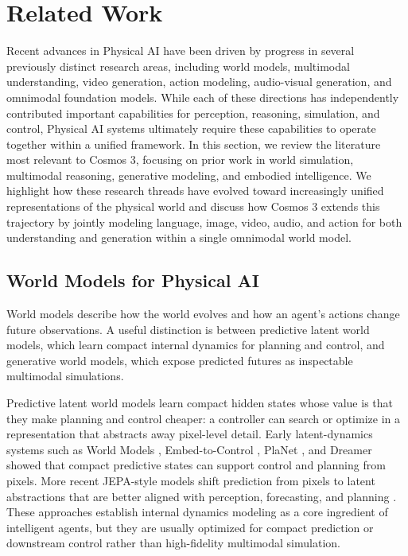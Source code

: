 \section{Related Work}
\label{sec::related_work}

Recent advances in Physical AI have been driven by progress in several previously distinct research areas, including world models, multimodal understanding, video generation, action modeling, audio-visual generation, and omnimodal foundation models. While each of these directions has independently contributed important capabilities for perception, reasoning, simulation, and control, Physical AI systems ultimately require these capabilities to operate together within a unified framework. In this section, we review the literature most relevant to Cosmos 3, focusing on prior work in world simulation, multimodal reasoning, generative modeling, and embodied intelligence. We highlight how these research threads have evolved toward increasingly unified representations of the physical world and discuss how Cosmos 3 extends this trajectory by jointly modeling language, image, video, audio, and action for both understanding and generation within a single omnimodal world model.

\subsection{World Models for Physical AI}
World models describe how the world evolves and how an agent's actions change future observations.
A useful distinction is between predictive latent world models, which learn compact internal dynamics for planning and control, and generative world models, which expose predicted futures as inspectable multimodal simulations.

Predictive latent world models learn compact hidden states whose value is that they make planning and control cheaper: a controller can search or optimize in a representation that abstracts away pixel-level detail.
Early latent-dynamics systems such as World Models \citep{ha2018world}, Embed-to-Control \citep{watter2015embed}, PlaNet \citep{hafner2018planet}, and Dreamer \citep{hafner2019dream} showed that compact predictive states can support control and planning from pixels.
More recent JEPA-style models shift prediction from pixels to latent abstractions that are better aligned with perception, forecasting, and planning \citep{lecun2022path,assran2023ijepa,bardes2024vjepa,assran2025v,leworldmodel}.
These approaches establish internal dynamics modeling as a core ingredient of intelligent agents, but they are usually optimized for compact prediction or downstream control rather than high-fidelity multimodal simulation.

